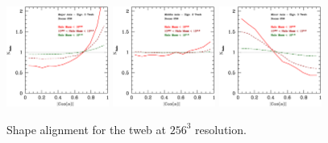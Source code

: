 \documentclass[usenatbib]{mn2e}
\begin{document}
\begin{figure}
\includegraphics[width=0.30\textwidth]{../plot2/Ax1_VT/256_AX1_T3.ps}
\includegraphics[width=0.30\textwidth]{../plot2/Ax2_VT/256_AX2_T2.ps}
\includegraphics[width=0.30\textwidth]{../plot2/Ax3_VT/256_AX3_T3.ps}
\caption{Shape alignment for the tweb at $256^3$ resolution.}
\end{figure}
\end{document}
